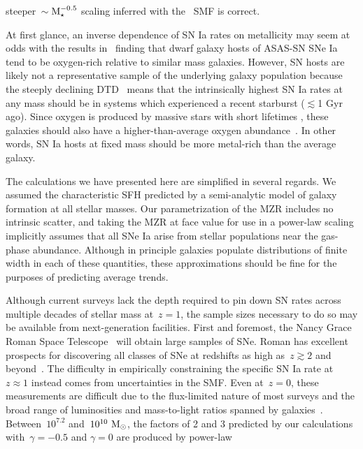 steeper~$\sim \text{M}_\star^{-0.5}$ scaling inferred with the~\citet{Bell2003} SMF is
correct.
\par
At first glance, an inverse dependence of SN Ia rates on metallicity may seem
at odds with the results in~\citet{Holoien2022} finding that dwarf galaxy
hosts of ASAS-SN SNe Ia tend to be oxygen-rich relative to similar mass
galaxies.
However, SN hosts are likely not a representative sample of the underlying
galaxy population because the steeply declining DTD~\citep[e.g.,][]{Maoz2012a}
means that the intrinsically highest SN Ia rates at any mass should be in
systems which experienced a recent starburst ($\lesssim$1 Gyr ago).
Since oxygen is produced by massive stars with short lifetimes
\citep*[e.g.,][]{Hurley2000, Johnson2019}, these galaxies should also have a
higher-than-average oxygen abundance~\citep[see, e.g.,][]{Johnson2020}.
In other words, SN Ia hosts at fixed mass should be more metal-rich than the
average galaxy.
\par
The calculations we have presented here are simplified in several regards.
We assumed the characteristic SFH predicted by a semi-analytic model of
galaxy formation at all stellar masses.
Our parametrization of the MZR includes no intrinsic scatter, and taking the
\citet{Zahid2014} MZR at face value for use in a power-law scaling implicitly
assumes that all SNe Ia arise from stellar populations near the gas-phase
abundance.
Although in principle galaxies populate distributions of finite width in each
of these quantities, these approximations should be fine for the purposes of
predicting average trends.
\par
Although current surveys lack the depth required to pin down SN rates across
multiple decades of stellar mass at~$z = 1$, the sample sizes necessary to do
so may be available from next-generation facilities.
First and foremost, the Nancy Grace Roman Space Telescope~\citep{Spergel2013,
Spergel2015} will obtain large samples of SNe.
Roman has excellent prospects for discovering all classes of SNe at redshifts
as high as~$z \gtrsim 2$ and beyond~\citep{Petrushevska2016}.
The difficulty in empirically constraining the specific SN Ia rate at
$z \approx 1$ instead comes from uncertainties in the SMF.
Even at~$z = 0$, these measurements are difficult due to the flux-limited
nature of most surveys and the broad range of luminosities and mass-to-light
ratios spanned by galaxies~\citep[see the discussion in][]{Weigel2016}.
Between~$10^{7.2}$ and~$10^{10}~\text{M}_\odot$, the factors of 2 and 3 predicted by our
calculations with~$\gamma = -0.5$ and $\gamma = 0$ are produced by power-law
